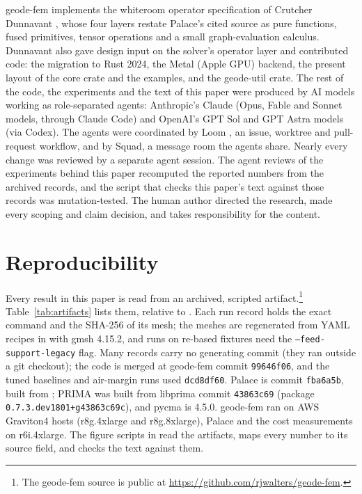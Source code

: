 \documentclass{anvil-paper}
\begin{document}
geode-fem implements the whiteroom operator specification of Crutcher
Dunnavant \citep{dunnavant2026whiteroom}, whose four layers restate Palace's
cited source as pure functions, fused primitives, tensor operations and a
small graph-evaluation calculus. Dunnavant also gave design input on the
solver's operator layer and contributed code: the migration to Rust 2024, the
Metal (Apple GPU) backend, the present layout of the core crate and the
examples, and the geode-util crate. The rest of the code, the experiments and
the text of this paper were produced by AI models working as role-separated
agents: Anthropic's Claude (Opus, Fable and Sonnet models, through Claude
Code) and OpenAI's GPT Sol and GPT Astra models (via Codex). The agents were
coordinated by Loom \citep{loom}, an issue, worktree and pull-request
workflow, and by Squad, a message room the agents share. Nearly every
change was reviewed by a separate agent session. The agent reviews of the
experiments behind this paper recomputed the reported numbers from the
archived records, and the script that checks this paper's text against
those records was mutation-tested. The human author directed the research,
made every scoping and claim decision, and takes responsibility for the
content.

\section{Reproducibility}
\label{sec:repro}

Every result in this paper is read from an archived, scripted
artifact.\footnote{The geode-fem source is public at
\url{https://github.com/rjwalters/geode-fem}.}
Table~\ref{tab:artifacts} lists them, relative to
. Each run record holds the exact
command and the SHA-256 of its mesh; the meshes are regenerated from YAML
recipes in  with gmsh 4.15.2, and runs on re-based
fixtures need the \texttt{--feed-support-legacy} flag. Many records carry no
generating commit (they ran outside a git checkout); the code is merged at
geode-fem commit \texttt{99646f06}, and the tuned baselines and air-margin
runs used \texttt{dcd8df60}. Palace is commit \texttt{fba6a5b}, built from
; PRIMA was built from libprima
commit \texttt{43863c69} (package \texttt{0.7.3.dev1801+g43863c69c}), and
pycma is 4.5.0. geode-fem ran on AWS Graviton4 hosts (r8g.4xlarge and
r8g.8xlarge), Palace and the cost measurements on r6i.4xlarge. The figure
scripts in  read the artifacts,  maps
every number to its source field, and  checks the
text against them.
\end{document}
